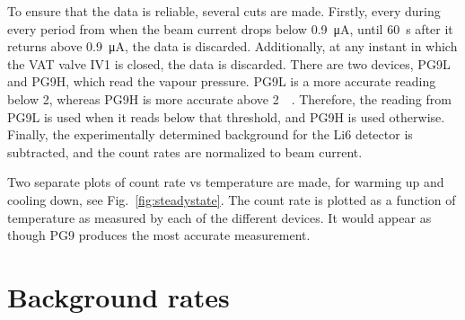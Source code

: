 \documentclass[10pt,letterpaper]{article}
\begin{document}
To ensure that the data is reliable, several cuts are made. Firstly, every during every period from when the beam current drops below \SI{0.9}{\micro\ampere}, until \SI{60}{\second} after it returns above \SI{0.9}{\micro\ampere}, the data is discarded. Additionally, at any instant in which the VAT valve IV1 is closed, the data is discarded. There are two devices, PG9L and PG9H, which read the vapour pressure. PG9L is a more accurate reading below \SI{2}{\torr}, whereas PG9H is more accurate above \SI{2}{\milli\torr}. Therefore, the reading from PG9L is used when it reads below that threshold, and PG9H is used otherwise. Finally, the experimentally determined background for the Li6 detector is subtracted, and the count rates are normalized to beam current.

Two separate plots of count rate vs temperature are made, for warming up and cooling down, see Fig.~\ref{fig:steadystate}. The count rate is plotted as a function of temperature as measured by each of the different devices. It would appear as though PG9 produces the most accurate measurement.





\section{Background rates}
\label{sec:background}
\end{document}
